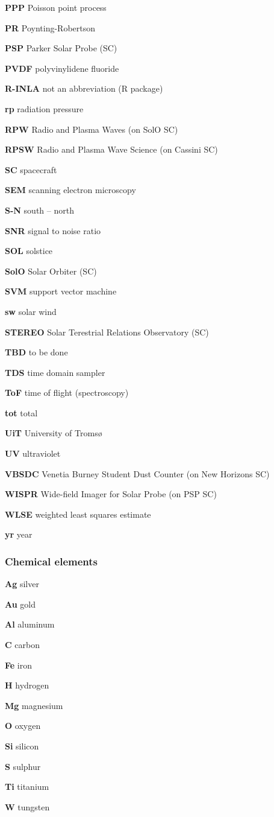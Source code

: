 \textbf{PPP} Poisson point process

\textbf{PR} Poynting-Robertson

\textbf{PSP} Parker Solar Probe (SC)

\textbf{PVDF} polyvinylidene fluoride

\textbf{R-INLA} not an abbreviation (R package)

\textbf{rp} radiation pressure

\textbf{RPW} Radio and Plasma Waves (on SolO SC)

\textbf{RPSW} Radio and Plasma Wave Science (on Cassini SC)

\textbf{SC} spacecraft

\textbf{SEM} scanning electron microscopy

\textbf{S-N} south -- north

\textbf{SNR} signal to noise ratio

\textbf{SOL} solstice

\textbf{SolO} Solar Orbiter (SC)

\textbf{SVM} support vector machine

\textbf{sw} solar wind

\textbf{STEREO} Solar Terestrial Relations Observatory (SC)

\textbf{TBD} to be done

\textbf{TDS} time domain sampler

\textbf{ToF} time of flight (spectroscopy)

\textbf{tot} total

\textbf{UiT} University of Troms{\o}

\textbf{UV} ultraviolet

\textbf{VBSDC} Venetia Burney Student Dust Counter (on New Horizons SC)

\textbf{WISPR} Wide-field Imager for Solar Probe (on PSP SC)

\textbf{WLSE} weighted least squares estimate

\textbf{yr} year


\subsubsection{Chemical elements}

\noindent

\textbf{Ag} silver

\textbf{Au} gold

\textbf{Al} aluminum

\textbf{C} carbon

\textbf{Fe} iron

\textbf{H} hydrogen 

\textbf{Mg} magnesium

\textbf{O} oxygen

\textbf{Si} silicon

\textbf{S} sulphur

\textbf{Ti} titanium

\textbf{W} tungsten